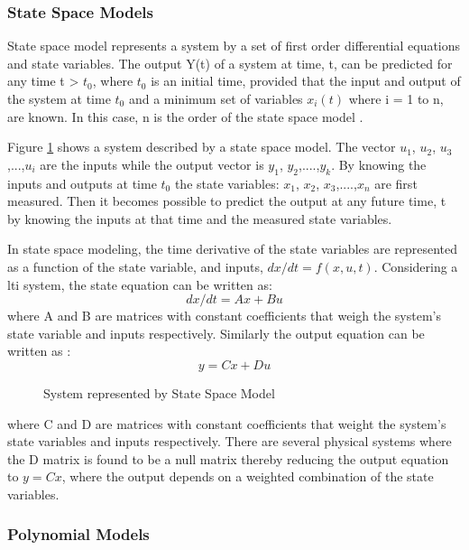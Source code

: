 \documentclass[article,type=msc,colorback,12pt,accentcolor=tud8b,table]{tudthesis}
\begin{document}
\subsubsection{State Space Models}

State space model represents a system by a set of first order differential equations and state variables. The output Y(t) of a system at time, t, can be predicted for any time t > $t_0$,  where $t_0$ is an initial time, provided that the input and output of the system at time $t_0$ and a minimum set of variables $x_i(t)$ where i = 1 to n, are known. In this case, n is the order of the state space model \cite{ljung1987system}. 

Figure \ref{fig:state_space_model} shows a system described by a state space model. The vector $u_1$, $u_2$, $u_3$,...,$u_i$ are the inputs while the output vector is $y_1$, $y_2$,....,$y_k$. By knowing the inputs and outputs at time $t_0$ the state variables: $x_1$, $x_2$, $x_3$,....,$x_n$ are first measured. Then it becomes possible to predict the output at any future time, t by knowing the inputs at that time and the measured state variables.

In state space modeling, the time derivative of the state variables are represented as a function of the state variable, and inputs, $dx/dt = f(x,u,t)$. Considering a \gls{lti} system, the state equation can be written as\cite{ljung1987system}: $$ dx/dt = Ax + Bu $$ where A and B are matrices with constant coefficients that weigh the system's state variable and inputs respectively. Similarly the output equation can be written as \cite{ljung1987system}: $$ y = Cx + Du $$ 

\begin{figure}
	\begin{center}
		\makebox[\textwidth]{\texttt{[image: B6]}}
	\end{center}
	\caption{System represented by State Space Model}
	\label{fig:state_space_model}
\end{figure}

where C and D are matrices with constant coefficients that weight the system's state variables and inputs respectively. There are several physical systems where the D matrix is found to be a null matrix thereby reducing the output equation to $ y = Cx $, where the output depends on a weighted combination of the state variables.

\subsubsection{Polynomial Models}
	
\end{document}
